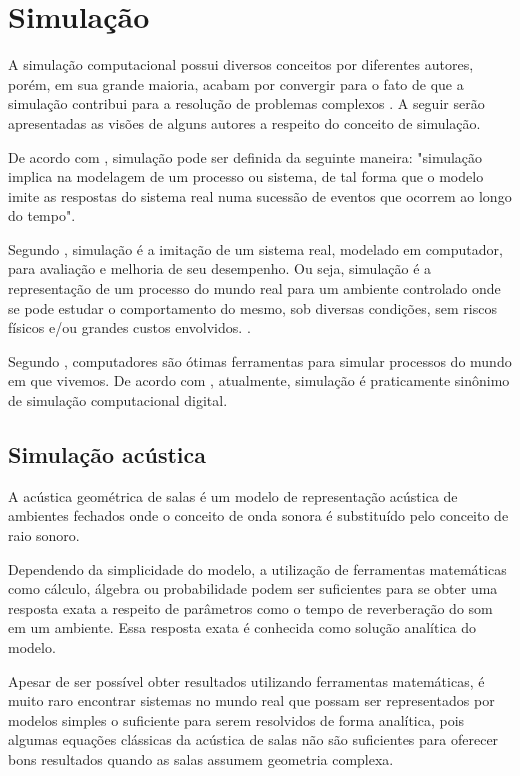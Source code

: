 \section{Simulação}

A simulação computacional possui diversos conceitos por diferentes autores, porém, em sua grande maioria, acabam por convergir para o fato de que a simulação contribui para a resolução de problemas complexos \cite{carvalho}. A seguir serão apresentadas as visões de alguns autores a respeito do conceito de simulação.

De acordo com \cite{schriber}, simulação pode ser definida da seguinte maneira: "simulação implica na modelagem de um processo ou sistema, de tal forma que o modelo imite as respostas do sistema real numa sucessão de eventos que ocorrem ao longo do tempo".

Segundo , simulação é a imitação de um sistema real, modelado em computador, para avaliação e melhoria de seu desempenho. Ou seja, simulação é a representação de um processo do mundo real para um ambiente controlado onde se pode estudar o comportamento do mesmo, sob diversas condições, sem riscos físicos e/ou grandes custos envolvidos. \cite{torga}.

Segundo , computadores são ótimas ferramentas para simular processos do mundo em que vivemos. De acordo com , atualmente, simulação é praticamente sinônimo de simulação computacional digital.

\subsection{Simulação acústica}

A acústica geométrica de salas é um modelo de representação acústica de ambientes fechados onde o conceito de onda sonora é substituído pelo conceito de raio sonoro. \cite{torres}

Dependendo da simplicidade do modelo, a utilização de ferramentas matemáticas como cálculo, álgebra ou probabilidade podem ser suficientes para se obter uma resposta exata a respeito de parâmetros como o tempo de reverberação do som em um ambiente. Essa resposta exata é conhecida como solução analítica do modelo. \cite{torres}

Apesar de ser possível obter resultados utilizando ferramentas matemáticas, é muito raro encontrar sistemas no mundo real que possam ser representados por modelos simples o suficiente para serem resolvidos de forma analítica, pois algumas equações clássicas da acústica de salas não são suficientes para oferecer bons resultados quando as salas assumem geometria complexa. \cite{bastos}


